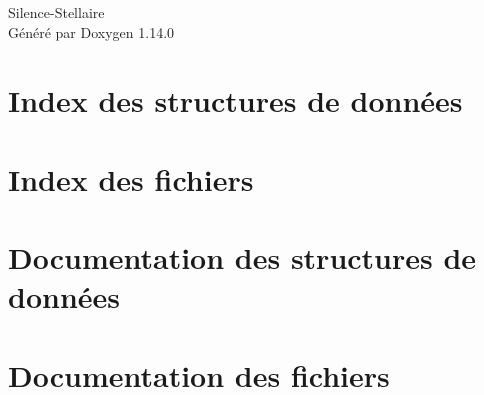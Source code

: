 \documentclass[twoside]{book}
\newcommand{\+}{\discretionary{\mbox{\scriptsize$\hookleftarrow$}}{}{}}
\newcommand{\clearemptydoublepage}{%
    \newpage{\pagestyle{empty}\cleardoublepage}%
  }
\begin{document}
  \raggedbottom
    \hypersetup{pageanchor=false,
                bookmarksnumbered=true,
                pdfencoding=unicode
               }
  \begin{titlepage}
  \vspace*{7cm}
  \begin{center}%
  {\Large Silence-\/\+Stellaire}\\
  \vspace*{1cm}
  {\large Généré par Doxygen 1.14.0}\\
  \end{center}
  \end{titlepage}
  \clearemptydoublepage
  \tableofcontents
  \clearemptydoublepage
  \hypersetup{pageanchor=true}
\chapter{Index des structures de données}

\chapter{Index des fichiers}

\chapter{Documentation des structures de données}























\chapter{Documentation des fichiers}





















  \backmatter
  \newpage
  \clearemptydoublepage
  \printindex
\end{document}
